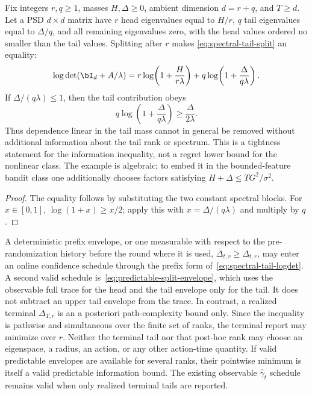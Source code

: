 \begin{proposition}
\label{prop:spectral-tail-tightness}
Fix integers $r,q\ge1$, masses $H,\Delta\ge0$, ambient dimension
$d=r+q$, and $T\ge d$.  Let a PSD
$d\times d$ matrix have $r$ head eigenvalues equal to $H/r$, $q$ tail eigenvalues equal to
$\Delta/q$, and all remaining eigenvalues zero, with the head values ordered
no smaller than the tail values.  Splitting after $r$ makes
\eqref{eq:spectral-tail-split} an equality:
\[
 \log\det(\bI_d+A/\lambda)
 =r\log\!\left(1+\frac{H}{r\lambda}\right)
 +q\log\!\left(1+\frac{\Delta}{q\lambda}\right).
\]
If $\Delta/(q\lambda)\le1$, then the tail contribution obeys
\[
 q\log\!\left(1+\frac{\Delta}{q\lambda}\right)
 \ge\frac{\Delta}{2\lambda}.
\]
Thus dependence linear in the tail mass cannot in general be removed without
additional information about the tail rank or spectrum.  This is a tightness
statement for the information inequality, not a regret lower bound for the
nonlinear class.  The example is algebraic; to embed it in the bounded-feature
bandit class one additionally chooses factors satisfying
$H+\Delta\le TG^2/\sigma^2$.
\end{proposition}
\begin{proof}
The equality follows by substituting the two constant spectral blocks.  For
$x\in[0,1]$, $\log(1+x)\ge x/2$; apply this with
$x=\Delta/(q\lambda)$ and multiply by $q$.
\end{proof}

A deterministic prefix envelope, or one measurable with respect to the
pre-randomization history before the round where it is used,
$\bar\Delta_{t,r}\ge\Delta_{t,r}$, may enter an online confidence schedule
through the prefix form of~\eqref{eq:spectral-tail-logdet}.  A second valid
schedule is~\eqref{eq:predictable-split-envelope}, which uses the observable
full trace for the head and the tail envelope only for the tail.  It does not
subtract an upper tail envelope from the trace.  In contrast, a
realized terminal $\Delta_{T,r}$ is an a posteriori path-complexity bound only.
Since the inequality is pathwise and simultaneous over the finite set of ranks,
the terminal report may minimize over $r$.  Neither the terminal tail nor that
post-hoc rank may choose an eigenspace, a radius, an action, or any other
action-time quantity.  If valid predictable envelopes are available for several
ranks, their pointwise minimum is itself a valid predictable information bound.
The existing observable $\hat\gamma_t$ schedule remains valid when only realized
terminal tails are reported.

